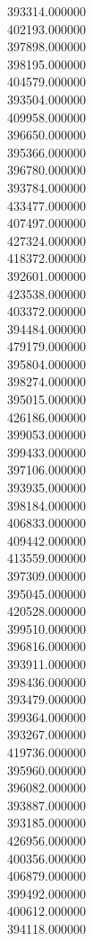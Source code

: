 393314.000000\\
402193.000000\\
397898.000000\\
398195.000000\\
404579.000000\\
393504.000000\\
409958.000000\\
396650.000000\\
395366.000000\\
396780.000000\\
393784.000000\\
433477.000000\\
407497.000000\\
427324.000000\\
418372.000000\\
392601.000000\\
423538.000000\\
403372.000000\\
394484.000000\\
479179.000000\\
395804.000000\\
398274.000000\\
395015.000000\\
426186.000000\\
399053.000000\\
399433.000000\\
397106.000000\\
393935.000000\\
398184.000000\\
406833.000000\\
409442.000000\\
413559.000000\\
397309.000000\\
395045.000000\\
420528.000000\\
399510.000000\\
396816.000000\\
393911.000000\\
398436.000000\\
393479.000000\\
399364.000000\\
393267.000000\\
419736.000000\\
395960.000000\\
396082.000000\\
393887.000000\\
393185.000000\\
426956.000000\\
400356.000000\\
406879.000000\\
399492.000000\\
400612.000000\\
394118.000000\\
